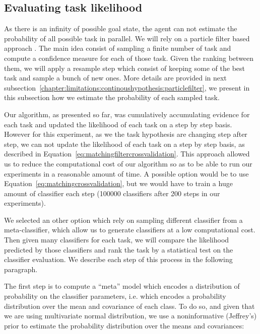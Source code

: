 \subsection{Evaluating task likelihood}

As there is an infinity of possible goal state, the agent can not estimate the probability of all possible task in parallel. We will rely on a particle filter based approach \cite{gordon1993novel,doucet2009tutorial,thrun2002particle}. The main idea consist of sampling a finite number of task and compute a confidence measure for each of those task. Given the ranking between them, we will apply a resample step which consist of keeping some of the best task and sample a bunch of new ones. More details are provided in next subsection~\ref{chapter:limitations:continoushypothesis:particlefilter}, we present in this subsection how we estimate the probability of each sampled task.

Our algorithm, as presented so far, was cumulatively accumulating evidence for each task and updated the likelihood of each task on a step by step basis. However for this experiment, as we the task hypothesis are changing step after step, we can not update the likelihood of each task on a step by step basis, as described in Equation~\ref{eq:matchingfiltercrossvalidation}. This approach allowed us to reduce the computational cost of our algorithm so as to be able to run our experiments in a reasonable amount of time. A possible option would be to use Equation~\ref{eq:matchingcrossvalidation}, but we would have to train a huge amount of classifier each step (100000 classifiers after 200 steps in our experiments).

We selected an other option which rely on sampling different classifier from a meta-classifier, which allow us to generate classifiers at a low computational cost. Then given many classifiers for each task, we will compare the likelihood predicted by those classifiers and rank the task by a statistical test on the classifier evaluation. We describe each step of this process in the following paragraph.

The first step is to compute a ``meta'' model which encodes a distribution of probability on the classifier parameters, i.e. which encodes a probability distribution over the mean and covariance of each class. To do so, and given that we are using multivariate normal distribution, we use a noninformative (Jeffrey's) prior \cite{gelman2003bayesian} to estimate the probability distribution over the means and covariances:

